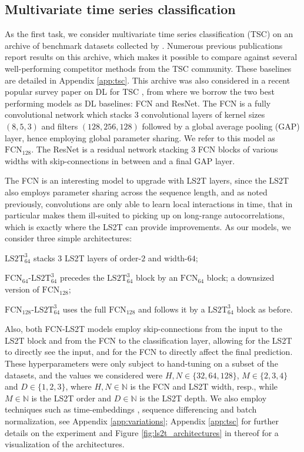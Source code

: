 \documentclass{article} \usepackage{iclr2021_conference,times}
\newcommand{\NN}{\mathbb{N}}
\newcommand{\FCN}[1]{\ensuremath{\text{FCN}_{#1}}}
\newcommand{\LStwoTwidth}[2]{\ensuremath{\text{LS2T}_{#1}^{#2}}}
\newcommand{\FCNLStwoTwidth}[3]{\ensuremath{\text{FCN}_{#1}\text{-}\text{LS2T}_{#2}^{#3}}}
\theoremstyle{plain}
\theoremstyle{definition}
\begin{document}
\subsection{Multivariate time series classification} \label{subseq:4_tsc}

As the first task, we consider multivariate time series classification (TSC) on an archive of benchmark datasets collected by \citet{baydogan2015multivarate}. Numerous previous publications report results on this archive, which makes it possible to compare against several well-performing competitor methods from the TSC community. These baselines are detailed in Appendix \ref{app:tsc}. This archive was also considered in a recent popular survey paper on DL for TSC \citep{Fawaz2019DLforTSC}, from where we borrow the two best performing models as DL baselines: FCN and ResNet. 
The FCN is a fully convolutional network which stacks 3 convolutional layers of kernel sizes $(8, 5, 3)$ and filters $(128, 256, 128)$ followed by a global average pooling (GAP) layer, hence employing global parameter sharing. We refer to this model as \FCN{128}. The ResNet is a residual network stacking 3 FCN blocks of various widths with skip-connections in between \citep{he2016deep} and a final GAP layer.

The FCN is an interesting model to upgrade with LS2T layers, since the LS2T also employs parameter sharing across the sequence length, and as noted previously, convolutions are only able to learn local interactions in time, that in particular makes them ill-suited to picking up on long-range autocorrelations, which is exactly where the LS2T can provide improvements. 
As our models, we consider three simple architectures: \begin{enumerate*}[label=(\roman*)] \item \LStwoTwidth{64}{3} stacks $3$ LS2T layers of order-$2$ and width-$64$; \item \FCNLStwoTwidth{64}{64}{3} precedes the \LStwoTwidth{64}{3} block by an \FCN{64} block; a downsized version of \FCN{128}; \item \FCNLStwoTwidth{128}{64}{3} uses the full \FCN{128} and follows it by a \LStwoTwidth{64}{3} block as before. \end{enumerate*} Also, both FCN-LS2T models employ skip-connections from the input to the LS2T block and from the FCN to the classification layer, allowing for the LS2T to directly see the input, and for the FCN to directly affect the final prediction. These hyperparameters were only subject to hand-tuning on a subset of the datasets, and the values we considered were $H, N \in \{32, 64, 128\}$, $M \in \{2, 3, 4\}$ and $D \in \{1, 2, 3\}$, where $H, N \in \NN$ is the FCN and LS2T width, resp., while $M \in \NN$ is the LS2T order and $D \in \NN$ is the LS2T depth. We also employ techniques such as time-embeddings \citep{Liu2018coordConv}, sequence differencing and batch normalization, see Appendix \ref{app:variations}; Appendix \ref{app:tsc} for further details on the experiment and Figure \ref{fig:ls2t_architectures} in thereof for a visualization of the architectures.
\end{document}
